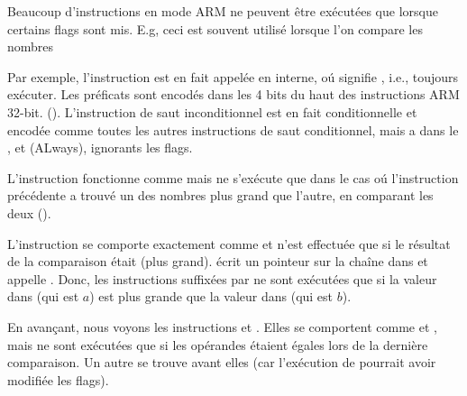 \label{subsec:jcc_ARM}

\mysubparagraph{\OptimizingKeilVI (\ARMMode)}




Beaucoup d'instructions en mode ARM ne peuvent être exécutées que lorsque certains
flags sont mis.
E.g, ceci est souvent utilisé lorsque l'on compare les nombres


Par exemple, l'instruction \ADD est en fait appelée  en interne, oú 
signifie , i.e., toujours exécuter.
Les préficats sont encodés dans les 4 bits du haut des instructions ARM 32-bit. ().
L'instruction de saut inconditionnel  est en fait conditionnelle et encodée
comme toutes les autres instructions de saut conditionnel, mais a  dans le
, et  (ALways), ignorants les flags.


L'instruction  fonctionne comme  mais ne s'exécute que dans le
cas oú l'instruction \CMP précédente a trouvé un des nombres plus grand que l'autre,
en comparant les deux ().


L'instruction  se comporte exactement comme  et n'est effectuée
que si le résultat de la comparaison était  (plus grand).
 écrit un pointeur sur la chaîne  dans 
et  appelle \printf.
Donc, les instructions suffixées par  ne sont exécutées que si la valeur
dans  (qui est $a$) est plus grande que la valeur dans  (qui est $b$).


En avançant, nous voyons les instructions  et .
Elles se comportent comme  et , mais ne sont exécutées que si les
opérandes étaient égales lors de la dernière comparaison.
Un autre \CMP se trouve avant elles (car l'exécution de \printf pourrait avoir
modifiée les flags).


